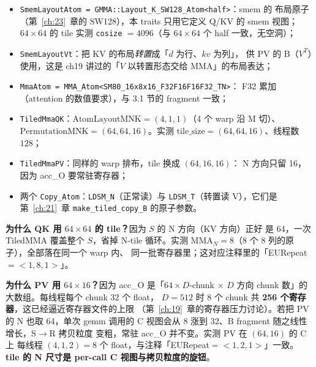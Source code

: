 \begin{itemize}
  \item \texttt{Smem\allowbreak{}Layout\allowbreak{}Atom =\allowbreak{} GMMA::\allowbreak{}Layout\_\allowbreak{}K\_\allowbreak{}SW128\_\allowbreak{}Atom\allowbreak{}<half>}：smem 的
        布局原子（第~\ref{ch:23}~章的 SW128），本 traits 只用它定义
        Q/KV 的 smem 视图；$64\times64$ 的 tile 实测
        \texttt{cosize} $=4096$（与 $64\times64$ 个 half 一致，无空洞）；
  \item \texttt{Smem\allowbreak{}Layout\allowbreak{}Vt}：把 KV 的布局\emph{转置}成「$d$ 为行、$kv$ 为列」，
        供 PV 的 B（$V^T$）使用，这是 ch19 讲过的「$V$ 以转置形态交给
        MMA」的布局表达；
  \item \texttt{Mma\allowbreak{}Atom =\allowbreak{} MMA\_\allowbreak{}Atom\allowbreak{}<SM80\_\allowbreak{}16x8x16\_\allowbreak{}F32\allowbreak{}F16\allowbreak{}F16\allowbreak{}F32\_\allowbreak{}TN>}：
        F32 累加（attention 的数值要求），与 3.1 节的 fragment 一致；
  \item \texttt{TiledMmaQK}：$\mathrm{AtomLayoutMNK} = (4,1,1)$（4 个 warp
        沿 M 切）、$\mathrm{PermutationMNK} = (64,64,16)$。实测
        $\mathrm{tile\_size} = (64,64,16)$、线程数 $128$；
  \item \texttt{TiledMmaPV}：同样的 warp 排布，tile 换成 $(64,16,16)$：
        N 方向只留 16，因为 acc\_O 要常驻寄存器；
  \item 两个 \texttt{Copy\_Atom}：\texttt{LDSM\_N}（正常读）与
        \texttt{LDSM\_T}（转置读 V），它们是第~\ref{ch:21}~章
        \texttt{make\_\allowbreak{}tiled\_\allowbreak{}copy\_\allowbreak{}B} 的原子参数。
\end{itemize}

\textbf{为什么 QK 用 $64\times64$ 的 tile？}因为 $S$ 的 N 方向（KV 方向）正好
是 64，一次 TiledMMA 覆盖整个 $S$，省掉 N-tile 循环。实测
$\mathrm{MMA}_N = 8$（$8$ 个 $8$ 列的原子），全部落在同一个 warp 内、
同一批寄存器里；这对应注释里的「EURepeat$=<1,8,1>$」。

\textbf{为什么 PV 用 $64\times16$？}因为 acc\_O 是「$64\times D$-chunk $\times$
$D$ 方向 chunk 数」的大数组。每线程每个 chunk 32 个 float，
$D=512$ 时 $8$ 个 chunk 共 \textbf{256 个寄存器}，这已经逼近寄存器文件的上限
（第~\ref{ch:19}~章的寄存器压力讨论）。若把 PV 的 N 也取 64，单次 gemm
调用的 C 视图会从 8 涨到 32、B fragment 随之线性增长，S$\to$R 拷贝粒度
变粗，常驻 acc\_O 并不变。实测 PV 在 $(64,16)$ 的 C 上
每线程 $(4,1,2) = 8$ 个 float，与注释「EURepeat$=<1,2,1>$」一致。
\textbf{tile 的 N 尺寸是 per-call C 视图与拷贝粒度的旋钮}。


